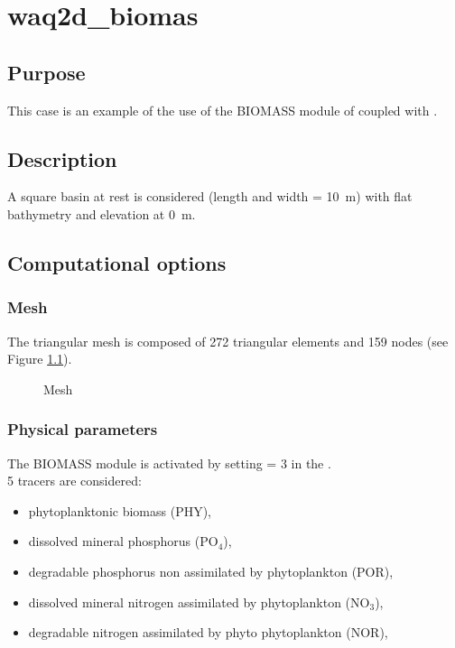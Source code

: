 \chapter{waq2d\_biomas}

\section{Purpose}

This case is an example of the use of the BIOMASS module of \waqtel coupled with
.

\section{Description}

A square basin at rest is considered (length and width = 10~m)
with flat bathymetry and elevation at 0~m.

\section{Computational options}

\subsection{Mesh}

The triangular mesh is composed of 272 triangular elements and 159 nodes
(see Figure \ref{fig:waq2d_biomas:mesh}).

\begin{figure}[H]
 \centering
\caption{Mesh}
 \label{fig:waq2d_biomas:mesh}
\end{figure}

\subsection{Physical parameters}

The BIOMASS module is activated by setting  = 3
in the  .\\

5 tracers are considered:
\begin{itemize}
\item phytoplanktonic biomass (PHY),
\item dissolved mineral phosphorus (PO$_4$),
\item degradable phosphorus non assimilated by phytoplankton (POR),
\item dissolved mineral nitrogen assimilated by phytoplankton (NO$_3$),
\item degradable nitrogen assimilated by phyto phytoplankton (NOR),
\end{itemize}

